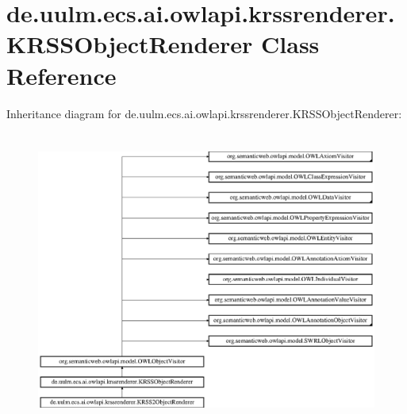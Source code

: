 \hypertarget{classde_1_1uulm_1_1ecs_1_1ai_1_1owlapi_1_1krssrenderer_1_1_k_r_s_s_object_renderer}{\section{de.\-uulm.\-ecs.\-ai.\-owlapi.\-krssrenderer.\-K\-R\-S\-S\-Object\-Renderer Class Reference}
\label{classde_1_1uulm_1_1ecs_1_1ai_1_1owlapi_1_1krssrenderer_1_1_k_r_s_s_object_renderer}
}
Inheritance diagram for de.\-uulm.\-ecs.\-ai.\-owlapi.\-krssrenderer.\-K\-R\-S\-S\-Object\-Renderer\-:\begin{figure}[H]
\begin{center}
\leavevmode
\includegraphics[height=9.811320cm]{classde_1_1uulm_1_1ecs_1_1ai_1_1owlapi_1_1krssrenderer_1_1_k_r_s_s_object_renderer}
\end{center}
\end{figure}
